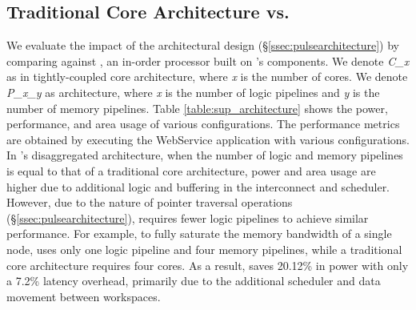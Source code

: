 \subsection{Traditional Core Architecture vs. \pulse} 
We evaluate the impact of the \pulse architectural design (\S\ref{ssec:pulsearchitecture}) by comparing \pulse against \pulsearch, an in-order processor built on \pulse's components. We denote \textit{C\_x} as in tightly-coupled core architecture, where \textit{x} is the number of cores. We denote \textit{P\_x\_y} as \pulse architecture, where \textit{x} is the number of logic pipelines and \textit{y} is the number of memory pipelines. Table \ref{table:sup_architecture} shows the power, performance, and area usage of various configurations. The performance metrics are obtained by executing the WebService application with various configurations. In \pulse's disaggregated architecture, when the number of logic and memory pipelines is equal to that of a traditional core architecture, power and area usage are higher due to additional logic and buffering in the interconnect and scheduler. However, due to the nature of pointer traversal operations (\S\ref{ssec:pulsearchitecture}), \pulse requires fewer logic pipelines to achieve similar performance. For example, to fully saturate the memory bandwidth of a single node, \pulse uses only one logic pipeline and four memory pipelines, while a traditional core architecture requires four cores. As a result, \pulse saves 20.12\% in power with only a 7.2\% latency overhead, primarily due to the additional scheduler and data movement between workspaces.

